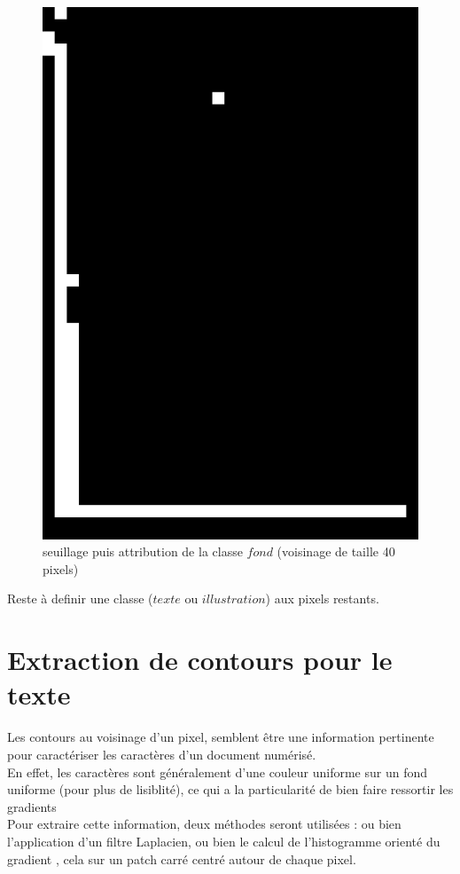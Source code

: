 \documentclass{book}
\begin{document}
\begin{figure}[H]
\begin{center}
\includegraphics[scale=0.075]{images/1g_seuil.jpg}
\end{center}
\caption{seuillage puis attribution de la classe $fond$ (voisinage de taille 40 pixels)}
\label{classe_fond}
\end{figure}

Reste à definir une classe ($texte$ ou $illustration$) aux pixels restants.

\section{Extraction de contours pour le texte}

Les contours au voisinage d'un pixel, semblent être une information pertinente pour caractériser les caractères d'un document numérisé.\\
En effet, les caractères sont généralement d'une couleur uniforme sur un fond uniforme (pour plus de lisiblité), ce qui a la 
particularité de bien faire ressortir les gradients\\
Pour extraire cette information, deux méthodes seront utilisées : ou bien l'application d'un filtre Laplacien, ou bien le calcul de l'histogramme orienté du gradient 
\cite{Dalal05histogramsof}, cela sur un patch carré centré autour de chaque pixel. 
\end{document}

